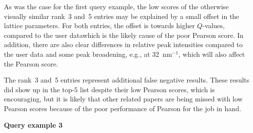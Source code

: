 \documentclass[preprint]{iucr}
\providecommand{\DIFadd}[1]{{\protect\color{blue}\uwave{#1}}} %
\providecommand{\DIFaddbegin}{} %
\providecommand{\DIFaddend}{} %
\newcommand{\DIFaddincludegraphics}[2][]{{\color{blue}\fbox{\DIFOincludegraphics[#1]{#2}}}} %
\DeclareRobustCommand{\DIFaddbegin}{\DIFOaddbegin \let\includegraphics\DIFaddincludegraphics} %
\DeclareRobustCommand{\DIFaddend}{\DIFOaddend \let\includegraphics\DIFOincludegraphics} %
\begin{document}
As was the case for the first query example, the low scores of the otherwise visually similar rank~3 and~5 entries may be explained by a small offset in the lattice parameters. For both entries, the offset is towards higher $Q$-values, compared to the user data\DIFaddbegin \DIFadd{, }\DIFaddend which is the likely cause of the poor Pearson score. In addition, there are also clear differences in relative peak intensities compared to the user data and some peak broadening, e.g., at 32~nm$^{-1}$, which will also affect the Pearson score.

The rank~3 and~5 entries represent additional false negative results.  These results did show up in the top-5 list despite their low Pearson scores, which is encouraging, but it is likely that other related papers are being missed with low Pearson scores because of the poor performance of Pearson for the job in hand.


\textbf{Query example 3}
\end{document}
